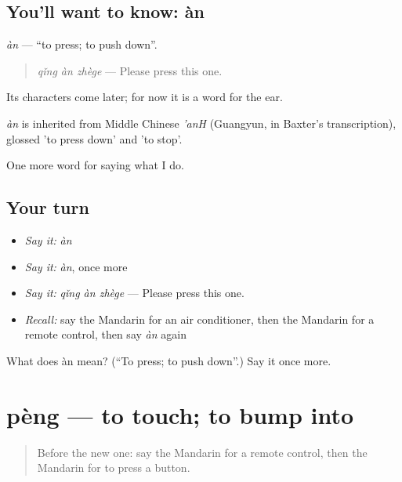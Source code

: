 \subsection*{You'll want to know: àn}
\emph{àn} — \textquotedblleft{}to press; to push down\textquotedblright{}.

\begin{quote}
\emph{qǐng àn zhège} — Please press this one.
\end{quote}

Its characters come later; for now it is a word for the ear.

\begin{cousinweb}
\emph{àn} is inherited from Middle Chinese \emph{'anH} (Guangyun, in Baxter's transcription), glossed 'to press down' and 'to stop'.
\end{cousinweb}

\begin{grammarlens}[title={What you've built}]
One more word for saying what I do.
\end{grammarlens}

\subsection*{Your turn}
\begin{itemize}
\raggedright
  \item \emph{Say it:} \emph{àn}
  \item \emph{Say it:} \emph{àn}, once more
  \item \emph{Say it:} \emph{qǐng àn zhège} — Please press this one.
  \item \emph{Recall:} say the Mandarin for an air conditioner, then the Mandarin for a remote control, then say \emph{àn} again
\end{itemize}

\begin{tcolorbox}[breakable,colback=teal!4,colframe=teal!35!black,title={Before you move on}]
What does àn mean? (\textquotedblleft{}To press; to push down\textquotedblright{}.) Say it once more.
\end{tcolorbox}
\section[pèng]{pèng — to touch; to bump into}

\label{lesson:ZH-C171-peng}



\begin{quote}
Before the new one: say the Mandarin for a remote control, then the Mandarin for to press a button.
\end{quote}

